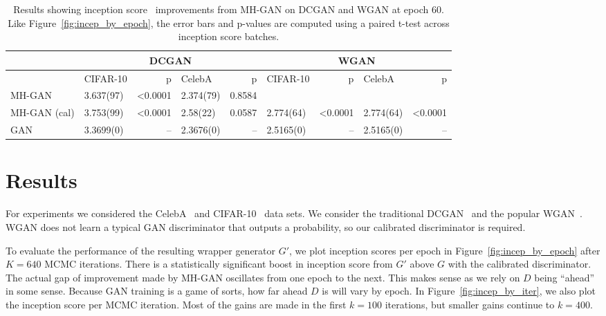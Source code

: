 \documentclass{article}
\begin{document}
\begin{table}[htbp]
\centering
    \caption{{\small
    Results showing inception score~\citep{Salimans2016} improvements from MH-GAN on DCGAN and WGAN at epoch 60.
    Like Figure~\ref{fig:incep_by_epoch}, the error bars and p-values are computed using a paired t-test across inception score batches.
    }}
    \label{tbl:inception}
{\scriptsize
\begin{tabular}{|l|l|r|l|r||l|r|l|r|}
\toprule
~                 & \multicolumn{4}{c}{DCGAN}                               & \multicolumn{4}{c}{WGAN} \\
\toprule
~                 & CIFAR-10         &      p   & CelebA         &      p   & CIFAR-10        &       p   & CelebA        &       p  \\
\midrule
MH-GAN              &        3.637(97) &  <0.0001 &      2.374(79) &  0.8584  &              ~  &        ~  &            ~  &      ~   \\
MH-GAN (cal)        &        3.753(99) &  <0.0001 &      2.58(22)  &  0.0587  &       2.774(64)  &  <0.0001 &     2.774(64) &  <0.0001 \\
GAN               &        3.3699(0) &       -- &      2.3676(0) &      --  &       2.5165(0) &        -- &     2.5165(0) &       -- \\
\bottomrule
\end{tabular}
}
\end{table}


\section{Results}
\label{sec:Results}

For experiments we considered the CelebA~\citep{Liu2015} and CIFAR-10~\citep{Torralba2008} data sets.
We consider the traditional DCGAN~\citep{Radford2015} and the popular WGAN~\citep{Arjovsky2017}\@.
WGAN does not learn a typical GAN discriminator that outputs a probability, so our calibrated discriminator is required.


To evaluate the performance of the resulting wrapper generator $G'$, we plot inception scores per epoch in Figure~\ref{fig:incep_by_epoch} after $K=640$ MCMC iterations.
There is a statistically significant boost in inception score from $G'$ above $G$ with the calibrated discriminator.
The actual gap of improvement made by MH-GAN oscillates from one epoch to the next.
This makes sense as we rely on $D$ being ``ahead'' in some sense.
Because GAN training is a game of sorts, how far ahead $D$ is will vary by epoch.
In Figure~\ref{fig:incep_by_iter}, we also plot the inception score per MCMC iteration.
Most of the gains are made in the first $k=100$ iterations, but smaller gains continue to $k=400$.
\end{document}
